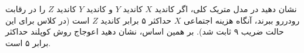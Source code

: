 نشان دهید در مدل متریک کلی، اگر کاندید
$X$
کاندید
$Y$
و کاندید
$Y$
کاندید
$Z$
را در رقابت رودررو ببرند، آنگاه هزینه اجتماعی
$X$
حداکثر ۵ برابر کاندید
$Z$
است (در کلاس برای این حالت ضریب ۹ ثابت شد). بر همین اساس، نشان دهید اعوجاج روش کوپلند حداکثر برابر ۵ است.

